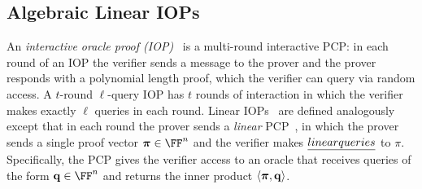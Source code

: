 \fi 


\subsection{Algebraic Linear IOPs} 

An \emph{interactive oracle proof (IOP)}~\cite{TCC:BenChiSpo16,STOC:ReiRotRot16} is a multi-round interactive PCP: in each round of an IOP the verifier sends a message to the prover and the prover responds with a polynomial length proof, which the verifier can query via random access. A $t$-round $\ell$-query IOP has $t$ rounds of interaction in which the verifier makes exactly $\ell$ queries in each round. Linear IOPs~\cite{C:BBCGI19} are defined analogously except that in each round the prover sends a \emph{linear} PCP~\cite{CC:IKO07}, in which the prover sends a single proof vector $\proofO \in \FF^n$ %
and the verifier makes $\emph{linear queries}$ to $\pi$. Specifically, the PCP gives the verifier access to an oracle that receives queries of the form $\mathbf{q} \in \FF^n$ and returns the inner product $\langle \boldsymbol{\pi}, \mathbf{q} \rangle$. 

